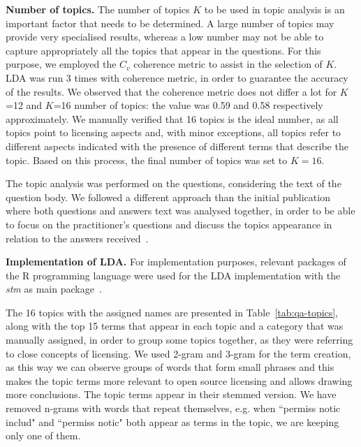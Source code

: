 \documentclass{elsarticle}
\begin{document}
\textbf{Number of topics.} The number of topics $K$ to be used in topic analysis is an important factor that needs to be determined. A large number of topics may provide very specialised results, whereas a low number may not be able to capture appropriately all the topics that appear in the questions. For this purpose, we employed the $C_v$ coherence metric to assist in the selection of $K$. %
LDA was run 3 times with coherence metric, in order to guarantee the accuracy of the results. We observed that the coherence metric does not differ a lot for $K$=12 and $K$=16 number of topics: the value was 0.59 and 0.58 respectively approximately. We manually verified that 16 topics is the ideal number, as all topics point to licensing aspects and, with minor exceptions, all topics refer to different aspects indicated with the presence of different terms that describe the topic. Based on this process, the final number of topics was set to $K=16$.

The topic analysis was performed on the questions, considering the text of the question body. We followed a different approach than the initial publication where both questions and answers text was analysed together, in order to be able to focus on the practitioner's questions and discuss the topics appearance in relation to the answers received~\cite{kapitsaki2020developers}. 

\textbf{Implementation of LDA.} For implementation purposes, relevant packages of the R programming language were used for the LDA implementation with the \emph{stm} as main package~\cite{roberts2019stm}. 

The 16 topics with the assigned names are presented in Table~\ref{tab:qa-topics}, along with the top 15 terms that appear in each topic and a category that was manually assigned, in order to group some topics together, as they were referring to close concepts of licensing. We used 2-gram and 3-gram for the term creation, as this way we can observe groups of words that form small phrases and this makes the topic terms more relevant to open source licensing and allows drawing more conclusions. The topic terms appear in their stemmed version. We have removed n-grams with words that repeat themselves, e.g. when ``permiss notic includ" and ``permiss notic" both appear as terms in the topic, we are keeping only one of them.

\noindent{}
\end{document}
